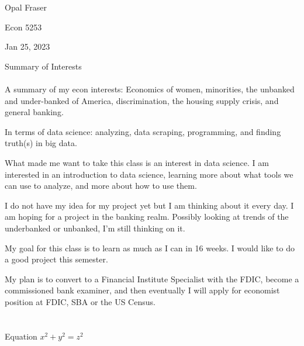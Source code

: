 \documentclass{article}
\begin{document}
Opal Fraser

Econ 5253

Jan 25, 2023

           
    Summary of Interests

\paragraph{}A summary of my econ interests: Economics of women, minorities, the unbanked and under-banked of America, discrimination, the housing supply crisis, and general banking. 

In terms of data science: analyzing, data scraping, programming, and finding truth(s) in big data.

What made me want to take this class is an interest in data science. I am interested in an introduction to data science, learning more about what tools we can use to analyze, and more about how to use them.

I do not have my idea for my project yet but I am thinking about it every day. I am hoping for a project in the banking realm. Possibly looking at trends of the underbanked or unbanked, I'm still thinking on it. 

My goal for this class is to learn as much as I can in 16 weeks. I would like to do a good project this semester. 

My plan is to convert to a Financial Institute Specialist with the FDIC, become a commissioned bank examiner, and then eventually I will apply for economist position at FDIC, SBA or the US Census. 

\section{}Equation                      
\(x^2 + y^2 = z^2\)
\end{document}
